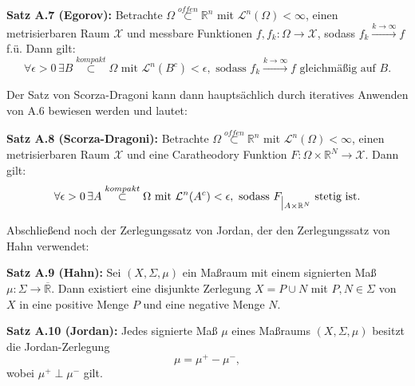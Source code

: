 \documentclass[
	language=german, %
	type=seminar, %
]{isthesis}
\begin{document}
\begin{appendix}
\colorbox{theored}{\begin{minipage}{16cm}{\textcolor{black}{}}
\textbf{Satz A.7 (Egorov):} Betrachte \(\Omega \stackrel{offen}{\subset} \mathbb{R}^n\) mit \(\mathcal{L}^n(\Omega) < \infty\), einen metrisierbaren Raum \(\mathcal{X}\) und messbare Funktionen \(f,f_k: \Omega \to \mathcal{X}\), sodass \(f_k \stackrel{k \to \infty}{\to} f\) f.ü. Dann gilt:
\begin{equation}
    \forall \epsilon > 0 \,\exists B \stackrel{kompakt}{\subset} \Omega \text{ mit } \mathcal{L}^n(B^c) < \epsilon, \text{ sodass } f_k \stackrel{k \to \infty}{\to} f \text{ gleichmäßig auf } B.
\end{equation}
\end{minipage}}

Der Satz von Scorza-Dragoni kann dann hauptsächlich durch iteratives Anwenden von A.6 bewiesen werden und lautet:\\
\colorbox{theored}{\begin{minipage}{16cm}{\textcolor{black}{}}
\textbf{Satz A.8 (Scorza-Dragoni):} Betrachte \(\Omega \stackrel{offen}{\subset} \mathbb{R}^n\) mit \(\mathcal{L}^n(\Omega) < \infty\), einen metrisierbaren Raum \(\mathcal{X}\) und eine Caratheodory Funktion \(F:\Omega \times \mathbb{R}^N \to \mathcal{X}\). Dann gilt:
\begin{equation}
    \forall \epsilon > 0\,\exists A \stackrel{kompakt}{\subset} \Omega \text{ mit } \mathcal{L}^n(A^c) < \epsilon, \text{ sodass } F_{\einschraenkung A \times \mathbb{R}^N} \text{ stetig ist}.
\end{equation}
\end{minipage}}

Abschließend noch der Zerlegungssatz von Jordan, der den Zerlegungssatz von Hahn verwendet:\\
\colorbox{theored}{\begin{minipage}{16cm}{\textcolor{black}{}}
\textbf{Satz A.9 (Hahn):} Sei \((X,\Sigma,\mu)\) ein Maßraum mit einem signierten Maß \(\mu: \Sigma \to \overline{\mathbb{R}}\). Dann existiert eine disjunkte Zerlegung \(X=P \cup N\) mit \(P,N \in \Sigma\) von \(X\) in eine positive Menge \(P\) und eine negative Menge \(N\).
\end{minipage}}

\colorbox{theored}{\begin{minipage}{16cm}{\textcolor{black}{}}
\textbf{Satz A.10 (Jordan):} Jedes signierte Maß \(\mu\) eines Maßraums \((X,\Sigma,\mu)\) besitzt die Jordan-Zerlegung
\begin{equation}
    \mu = \mu^+ - \mu^-,
\end{equation}
wobei \(\mu^+ \perp \mu^-\) gilt.
\end{minipage}}
\end{appendix}
\end{document}
